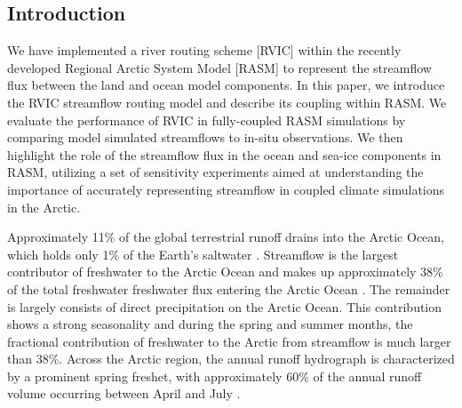 \documentclass[jgrga, draft]{agutex}
\begin{document}
%

\begin{article}

%
%

\section{Introduction}

We have implemented a river routing scheme [RVIC] within the recently developed Regional Arctic System Model [RASM] to represent the streamflow flux between the land and ocean model components.
In this paper, we introduce the RVIC streamflow routing model and describe its coupling within RASM.
We evaluate the performance of RVIC in fully-coupled RASM simulations by comparing model simulated streamflows to in-situ observations.
We then highlight the role of the streamflow flux in the ocean and sea-ice components in RASM, utilizing a set of sensitivity experiments aimed at understanding the importance of accurately representing streamflow in coupled climate simulations in the Arctic.

Approximately 11\% of the global terrestrial runoff drains into the Arctic Ocean, which holds only 1\% of the Earth's saltwater \citep{Lewis_2000,Lammers_2001}.
Streamflow is the largest contributor of freshwater to the Arctic Ocean and makes up approximately 38\% of the total freshwater freshwater flux entering the Arctic Ocean \citep{Serreze_2006}. The remainder is largely consists of direct precipitation on the Arctic Ocean.
This contribution shows a strong seasonality and during the spring and summer months, the fractional contribution of freshwater to the Arctic from streamflow is much larger than 38\%.
Across the Arctic region, the annual runoff hydrograph is characterized by a prominent spring freshet, with approximately 60\% of the annual runoff volume occurring between April and July \citep{Lammers_2001}.


\end{article}
\end{document}
